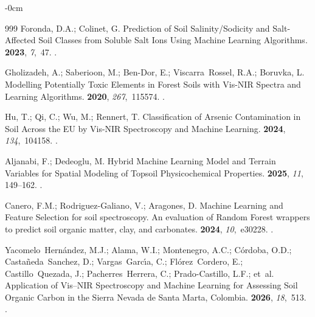 \documentclass[environremediat,article,accept,pdftex,oneauthor]{Definitions/mdpi}
\begin{document}
\begin{adjustwidth}{-\extralength}{0cm}
\begin{thebibliography}{999}
Foronda, D.A.; Colinet, G.
\newblock Prediction of Soil Salinity/Sodicity and Salt-Affected Soil Classes
  from Soluble Salt Ions Using Machine Learning Algorithms.
 {\bf 2023}, {\em 7},~47.
.

Gholizadeh, A.; Saberioon, M.; Ben-Dor, E.; Viscarra~Rossel, R.A.; Boruvka, L.
\newblock Modelling Potentially Toxic Elements in Forest Soils with Vis-NIR
  Spectra and Learning Algorithms.
 {\bf 2020}, {\em 267},~115574.
.

Hu, T.; Qi, C.; Wu, M.; Rennert, T.
\newblock Classification of Arsenic Contamination in Soil Across the EU by
  Vis-NIR Spectroscopy and Machine Learning.
 {\bf 2024}, {\em 134},~104158.
.

Aljanabi, F.; Dedeoglu, M.
\newblock Hybrid Machine Learning Model and Terrain Variables for Spatial
  Modeling of Topsoil Physicochemical Properties.
 {\bf
  2025}, {\em 11}, 149--162.
.

Canero, F.M.; Rodriguez-Galiano, V.; Aragones, D.
\newblock Machine Learning and Feature Selection for soil spectroscopy. An
  evaluation of Random Forest wrappers to predict soil organic matter, clay,
  and carbonates.
 {\bf 2024}, {\em 10},~e30228.
.

Yacomelo~Hern{\'a}ndez, M.J.; Alama, W.I.; Montenegro, A.C.; C{\'o}rdoba, O.D.;
  Casta{\~n}eda~Sanchez, D.; Vargas~Garc{\'\i}a, C.; Fl{\'o}rez~Cordero, E.;
  Castillo~Quezada, J.; Pacherres~Herrera, C.; Prado-Castillo, L.F.;  et~al.
\newblock Application of Vis--NIR Spectroscopy and Machine Learning for
  Assessing Soil Organic Carbon in the Sierra Nevada de Santa Marta, Colombia.
 {\bf 2026}, {\em 18},~513.
.


\end{thebibliography}
\end{adjustwidth}
\end{document}
